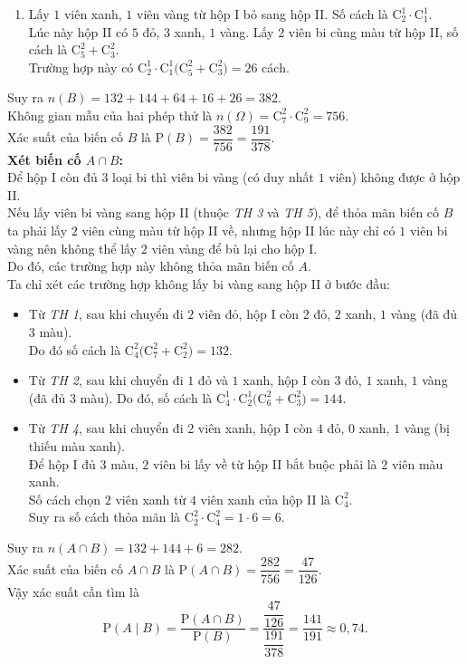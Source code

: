 \begin{ex}
{\begin{enumerate}[\it TH 1:]
			Trường hợp này có $\mathrm{C}_2^2 \big( \mathrm{C}_5^2 + \mathrm{C}_4^2 \big) = 16$ cách.
			\item Lấy $1$ viên xanh, $1$ viên vàng từ hộp I bỏ sang hộp II. Số cách là $\mathrm{C}_2^1 \cdot \mathrm{C}_1^1$.\\
			Lúc này hộp II có $5$ đỏ, $3$ xanh, $1$ vàng. Lấy $2$ viên bi cùng màu từ hộp II, số cách là $\mathrm{C}_5^2 + \mathrm{C}_3^2$.\\
			Trường hợp này có $\mathrm{C}_2^1 \cdot \mathrm{C}_1^1 \big( \mathrm{C}_5^2 + \mathrm{C}_3^2 \big) = 26$ cách.
		\end{enumerate}
		Suy ra $n(B) = 132 + 144 + 64 + 16 + 26 = 382$.\\
		Không gian mẫu của hai phép thử là $n(\Omega) = \mathrm{C}_7^2 \cdot \mathrm{C}_9^2 = 756$.\\
		Xác suất của biến cố $B$ là $\mathrm{P}(B) = \dfrac{382}{756} = \dfrac{191}{378}$.\\
		\textbf{Xét biến cố $A\cap B$:}\\
		Để hộp I còn đủ $3$ loại bi thì viên bi vàng (có duy nhất $1$ viên) không được ở hộp II.\\ Nếu lấy viên bi vàng sang hộp II (thuộc \textit{TH 3} và \textit{TH 5}), để thỏa mãn biến cố $B$ ta phải lấy $2$ viên cùng màu từ hộp II về, nhưng hộp II lúc này chỉ có $1$ viên bi vàng nên không thể lấy $2$ viên vàng để bù lại cho hộp I.\\
		Do đó, các trường hợp này không thỏa mãn biến cố $A$. \\
		Ta chỉ xét các trường hợp không lấy bi vàng sang hộp II ở bước đầu:
		\begin{itemize}
			\item Từ \textit{TH 1}, sau khi chuyển đi $2$ viên đỏ, hộp I còn $2$ đỏ, $2$ xanh, $1$ vàng (đã đủ $3$ màu). \\
			Do đó số cách là $\mathrm{C}_4^2 \big( \mathrm{C}_7^2 + \mathrm{C}_2^2 \big) = 132$.
			\item Từ \textit{TH 2}, sau khi chuyển đi $1$ đỏ và $1$ xanh, hộp I còn $3$ đỏ, $1$ xanh, $1$ vàng (đã đủ $3$ màu).
			Do đó, số cách là $\mathrm{C}_4^1 \cdot \mathrm{C}_2^1 \big( \mathrm{C}_6^2 + \mathrm{C}_3^2 \big) = 144$.
			\item Từ \textit{TH 4}, sau khi chuyển đi $2$ viên xanh, hộp I còn $4$ đỏ, $0$ xanh, $1$ vàng (bị thiếu màu xanh). \\
			Để hộp I đủ $3$ màu, $2$ viên bi lấy về từ hộp II bắt buộc phải là $2$ viên màu xanh.\\
			Số cách chọn $2$ viên xanh từ $4$ viên xanh của hộp II là $\mathrm{C}_4^2$.\\
			Suy ra số cách thỏa mãn là $\mathrm{C}_2^2 \cdot \mathrm{C}_4^2 = 1 \cdot 6 = 6$.
		\end{itemize}
		Suy ra $n(A \cap B) = 132 + 144 + 6 = 282$.\\
		Xác suất của biến cố $A \cap B$ là $\mathrm{P}(A \cap B) = \dfrac{282}{756} = \dfrac{47}{126}$.\\
		Vậy xác suất cần tìm là
		\[ \mathrm{P}(A \mid B) = \dfrac{\mathrm{P}(A \cap B)}{\mathrm{P}(B)} = \dfrac{\dfrac{47}{126}}{\dfrac{191}{378}} = \dfrac{141}{191} \approx 0{,}74. \]
	}
\end{ex}
